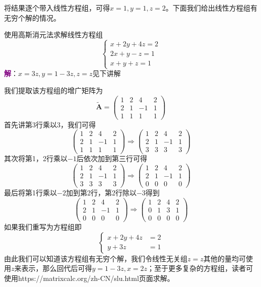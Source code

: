 将结果逐个带入线性方程组，可得$x=1,y=1,z=2$。下面我们给出线性方程组有无穷个解的情况。

\begin{example}
	使用高斯消元法求解线性方程组$$\left\{\begin{matrix} 
	x+2y+4z=2 \\  
	2x+y-z=1\\
	x+y+z=1
\end{matrix}\right. $$
\tcblower
\textcolor{purple}{\textbf{解}}：$x=3z,y=1-3z,z=z$见下讲解
\end{example}

我们提取该方程组的增广矩阵为$$\tilde{\mathbf{A}}=\begin{pmatrix}
	1 & 2 & 4 & 2\\
	2 & 1 & -1 & 1\\
	1 & 1 & 1 & 1
\end{pmatrix}$$首先讲第3行乘以3，我们可得$$\begin{pmatrix}
	1 & 2 & 4 & 2\\
	2 & 1 & -1 & 1\\
	1 & 1 & 1 & 1
   \end{pmatrix}\Longrightarrow  \begin{pmatrix}
	1 & 2 & 4 & 2\\
	2 & 1 & -1 & 1\\
	3 & 3 & 3 & 3
\end{pmatrix}$$其次将第1，2行乘以$-1$后依次加到第三行可得$$\begin{pmatrix}
	1 & 2 & 4 & 2\\
	2 & 1 & -1 & 1\\
	3 & 3 & 3 & 3
\end{pmatrix}\Longrightarrow  \begin{pmatrix}
	1 & 2 & 4 & 2\\
	2 & 1 & -1 & 1\\
	0 & 0 & 0 & 0
\end{pmatrix}$$最后将第1行乘以$-2$加到第2行，第2行除以$-3$得到$$\begin{pmatrix}
	1 & 2 & 4 & 2\\
	2 & 1 & -1 & 1\\
	0 & 0 & 0 & 0
\end{pmatrix}\Longrightarrow  \begin{pmatrix}
	1 & 2 & 4 & 2\\
	0 & 1 & 3 & 1\\
	0 & 0 & 0 & 0
\end{pmatrix}$$如果我们重写为方程组即$$\left\{\begin{aligned} 
	x+2y+4z&=2 \\  
	y+3z&=1
\end{aligned}\right. $$由此我们可以知道该方程组有无穷个解，我们令线性无关组$z=z$其他的量均可使用$z$来表示，那么回代后可得$y=1-3z,x=2z$；至于更多复杂的方程组，读者可使用https://matrixcalc.org/zh-CN/slu.html页面求解。

